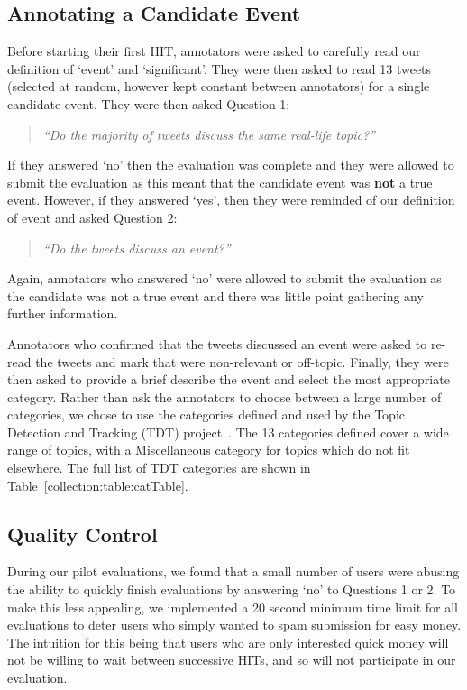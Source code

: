 \subsection{Annotating a Candidate Event}
Before starting their first HIT, annotators were asked to carefully read our definition of `event' and `significant'.
They were then asked to read 13 tweets (selected at random, however kept constant between annotators) for a single candidate event.
They were then asked Question 1:
\begin{quote}\emph{``Do the majority of tweets discuss the same real-life topic?''}
\end{quote}
If they answered `no' then the evaluation was complete and they were allowed to submit the evaluation as this meant that the candidate event was \textbf{not} a true event.
However, if they answered `yes', then they were reminded of our definition of event and asked Question 2:
\begin{quote}
\emph{``Do the tweets discuss an event?''}
\end{quote}
Again, annotators who answered `no' were allowed to submit the evaluation as the candidate was not a true event and there was little point gathering any further information.

Annotators who confirmed that the tweets discussed an event were asked to re-read the tweets and mark that were non-relevant or off-topic.
Finally, they were then asked to provide a brief describe the event and select the most appropriate category.
Rather than ask the annotators to choose between a large number of categories, we chose to use the categories defined and used by the Topic Detection and Tracking (TDT) project~\cite{Allan:2002:ITD:772260.772262}.
The 13 categories defined cover a wide range of topics, with a Miscellaneous category for topics which do not fit elsewhere.
The full list of TDT categories are shown in Table~\ref{collection:table:catTable}.

\subsection{Quality Control}
\label{sec:spam}
During our pilot evaluations, we found that a small number of users were abusing the ability to quickly finish evaluations by answering `no' to Questions 1 or 2.
To make this less appealing, we implemented a 20 second minimum time limit for all evaluations to deter users who simply wanted to spam submission for easy money.
The intuition for this being that users who are only interested quick money will not be willing to wait between successive HITs, and so will not participate in our evaluation.

